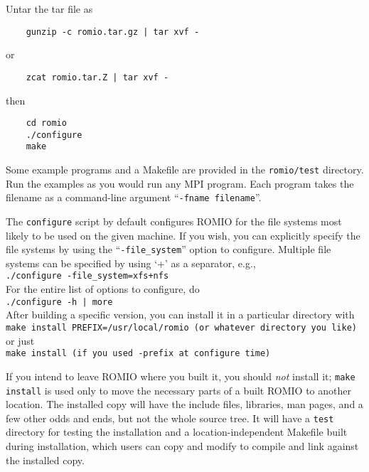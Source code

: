 Untar the tar file as
\begin{verbatim}
    gunzip -c romio.tar.gz | tar xvf -
\end{verbatim}
{\noindent or}
\begin{verbatim}
    zcat romio.tar.Z | tar xvf -
\end{verbatim}

{\noindent then}

\begin{verbatim}
    cd romio
    ./configure
    make
\end{verbatim}

Some example programs and a Makefile are provided in the {\tt romio/test}
directory.  Run the examples as you would run any MPI program. Each
program takes the filename as a command-line argument ``{\tt -fname
filename}''.

The {\tt configure} script by default configures ROMIO for the file
systems most likely 
to be used on the given machine. If you wish, you can explicitly specify the file
systems by using the ``{\tt -file\_system}'' option to configure. Multiple file
systems can be specified by using `+' as a separator, e.g., \\
\hspace*{.4in} {\tt ./configure -file\_system=xfs+nfs} \\
For the entire list of options to configure, do\\ 
\hspace*{.4in} {\tt ./configure -h | more} \\
After building a specific version, you can install it in a
particular directory with \\
\hspace*{.4in} {\tt make install PREFIX=/usr/local/romio    (or whatever directory you like)} \\
or just\\
\hspace*{.4in} {\tt make install          (if you used -prefix at configure time)}

If you intend to leave ROMIO where you built it, you should {\it not}
install it; {\tt make install} is used only to move the necessary
parts of a built ROMIO to another location. The installed copy will
have the include files, libraries, man pages, and a few other odds and
ends, but not the whole source tree.  It will have a {\tt test}
directory for testing the installation and a location-independent
Makefile built during installation, which users can copy and modify to
compile and link against the installed copy.

